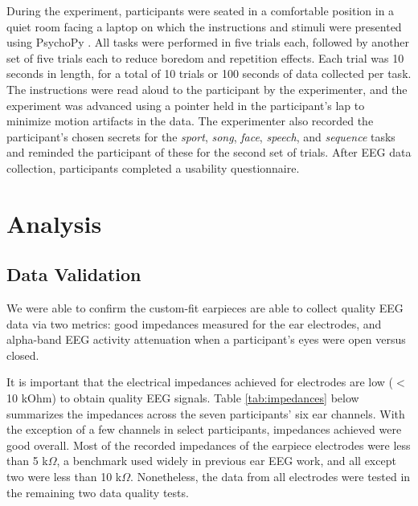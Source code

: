 \documentclass{sigchi}
\begin{document}
During the experiment, participants were seated in a comfortable position in a quiet room facing a laptop on which the instructions and stimuli were presented using PsychoPy \cite{peirce2007psychopy}. All tasks were performed in five trials each, followed by another set of five trials each to reduce boredom and repetition effects. Each trial was 10 seconds in length, for a total of 10 trials or 100 seconds of data collected per task. The instructions were read aloud to the participant by the experimenter, and the experiment was advanced using a pointer held in the participant's lap to minimize motion artifacts in the data. The experimenter also recorded the participant's chosen secrets for the \textit{sport}, \textit{song}, \textit{face}, \textit{speech}, and \textit{sequence} tasks and reminded the participant of these for the second set of trials. After EEG data collection, participants completed a usability questionnaire.

\section{Analysis}
\subsection{Data Validation}

We were able to confirm the custom-fit earpieces are able to collect quality EEG data via two metrics: good impedances measured for the ear electrodes, and alpha-band EEG activity attenuation when a participant's eyes were open versus closed.

It is important that the electrical impedances achieved for electrodes are low ($<$10 kOhm) to obtain quality EEG signals. Table \ref{tab:impedances} below summarizes the impedances across the seven participants' six ear channels. With the exception of a few channels in select participants, impedances achieved were good overall. Most of the recorded impedances of the earpiece electrodes were less than 5 k\(\Omega\), a benchmark used widely in previous ear EEG work, and all except two were less than 10 k\(\Omega\). Nonetheless, the data from all electrodes were tested in the remaining two data quality tests.
\end{document}

